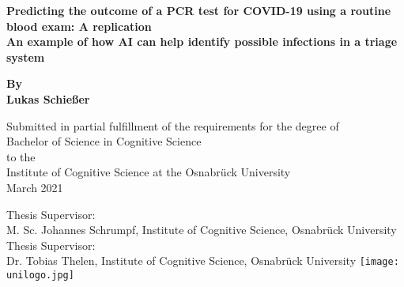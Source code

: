 \begin{titlepage}
	\begin{center}
		\vspace*{1cm}
		\Huge
		\textbf{Predicting the outcome of a PCR test for COVID-19 using a 
routine blood exam: A replication \\} 
		\vspace{0.5cm}
		\Large
		\textbf{An example of how AI can help identify possible infections in 
a triage system}
		
		\vspace{1cm}
		
		\textbf{By \\ Lukas Schießer}
		
		\vspace{1cm}
		\small
		Submitted in partial fulfillment of the requirements for the degree of \\
		Bachelor of Science in Cognitive Science \\ to the \\
		Institute of Cognitive Science at the Osnabrück University\\
		March 2021
		
		\vfill
		\vspace{1cm}
		Thesis Supervisor:\\ M. Sc. Johannes Schrumpf, Institute of Cognitive 
Science, Osnabrück University \\
		Thesis Supervisor:\\   Dr. Tobias Thelen, Institute of Cognitive 
Science, Osnabrück University
		\vfill 
		\texttt{[image: unilogo.jpg]}
		
		
	\end{center}
\end{titlepage}
